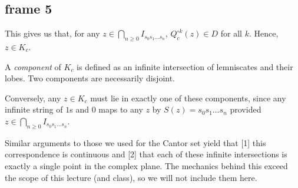 \documentclass[xcolor=x11names,compress]{beamer}
\renewcommand{\(}{\begin{columns}}
\renewcommand{\)}{\end{columns}}
\newcommand{\<}[1]{\begin{column}{#1}}
\renewcommand{\>}{\end{column}}
\begin{document}
\subsection{frame 5}
\begin{frame}

This gives us that, for any $z \in \bigcap_{n\ge 0} I_{s_0s_1\ldots s_n}$, $Q_c^{\circ k} (z) \in D$ for all $k$. Hence, $z \in K_c$.

\vspace{0.4cm}
\pause

A \textsl{component} of $K_c$ is defined as an infinite intersection of lemniscates and their lobes. Two components are necessarily disjoint.

\vspace{0.4cm}
\pause

Conversely, any $z \in K_c$ must lie in exactly one of these components, since any infinite string of $1$s and $0$
maps to any $z$ by $S(z) = s_0s_1\ldots s_n$ provided $z\in \bigcap_{n\ge 0} I_{s_0s_1 \ldots s_n}$.

\vspace{0.4cm}
\pause

Similar arguments to those we used for the Cantor set yield that [1] this correspondence is continuous and [2] that each of these infinite intersections is exactly a single point in the complex plane. The mechanics behind this exceed the scope of this lecture (and class), so we will not include them here.



\end{frame}




\end{document}
